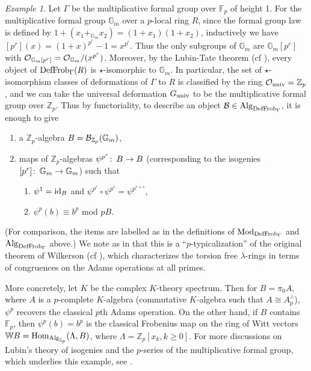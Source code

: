 \documentclass{gtpart}
\theoremstyle{definition}
\theoremstyle{remark}
\newtheorem{exam}[thm]{Example}
\def\co{\colon\thinspace}
\newcommand{\mb}[1]{\mathbb{#1}}
\newcommand{\Hom}{\ensuremath{{\rm Hom}}}
\newcommand{\Mod}{{\rm Mod}}
\newcommand{\Alg}{{\rm Alg}}
\newcommand{\CO}{{\cal O}}
\newcommand{\DF}{{{\rm DefFrob}_\Gamma}}
\newcommand{\Gm}{{{\mb G}_m}}
\begin{document}
\begin{exam}
\label{ex:K}
Let $\Gamma$ be the multiplicative formal group over ${\mb F}_p$ 
of height 1.  For the multiplicative formal group $\Gm$ over a 
$p$-local ring $R$, since the formal group law is defined by 
$1 + (x_1 +_\Gm x_2) = (1 + x_1)(1 + x_2)$, inductively we have 
$[p^r](x) = (1 + x)^{p^r} - 1 = x^{p^r}$.  Thus the only subgroups 
of $\Gm$ are $\Gm [p^r]$ with $\CO_{\Gm [p^r]} = \CO_\Gm / (x^{p^r})$.  
Moreover, by the Lubin-Tate theorem (cf \cite{lubintate}), every object of $\DF(R)$ is 
$\star$-isomorphic to $\Gm$.  In particular, the set of 
$\star$-isomorphism classes of deformations of $\Gamma$ to $R$ 
is classified by the ring $\CO_{\rm univ} = {\mb Z}_p$, and we 
can take the universal deformation $G_{\rm univ}$ to be the 
multiplicative formal group over ${\mb Z}_p$.  Thus by functoriality, 
to describe an object ${\cal B} \in \Alg_\DF$, it is enough to give
\begin{enumerate}
\item a ${\mb Z}_p$-algebra $B = {\cal B}_{{\mb Z}_p}(\Gm)$, 
\item maps of ${\mb Z}_p$-algebras $\psi^{p^r}\co B \to B$ 
(corresponding to the isogenies $[p^r]\co \Gm \to \Gm$) such that 
\begin{enumerate}
 \item $\psi^1 = {\rm id}_B$ and $\psi^{p^r} \circ \psi^{p^s} = 
\psi^{p^{r+s}}$,
 \item $\psi^p(b) \equiv b^p$ mod $pB$.
\end{enumerate}
\end{enumerate}
(For comparison, the items are labelled as in the definitions of $\Mod_\DF$ and 
$\Alg_\DF$ above.)  We note as in \cite{cong} that this is a 
``$p$-typicalization'' of the original theorem of Wilkerson 
(cf \cite{wilkerson}), which characterizes the torsion free $\lambda$-rings 
in terms of congruences on the Adams operations at all primes.

More concretely, let $K$ be the complex $K$-theory spectrum.  Then 
for $B = \pi_0 A$, where $A$ is a $p$-complete $K$-algebra 
(commutative $K$-algebra such that $A \cong A_p^\wedge$), $\psi^p$ 
recovers the classical $p$th Adams operation.  On the other hand, 
if $B$ contains ${\mb F}_p$, then $\psi^p(b) = b^p$ is the 
classical Frobenius map on the ring of Witt vectors 
${\mb W} B = \Hom_{\Alg_{{\mb Z}_p}} (\Lambda,B)$, where 
$\Lambda = {\mb Z}_p [x_k, k \geq 0]$.  For more discussions on 
Lubin's theory of isogenies and the $p$-series of the multiplicative 
formal group, which underlies this example, see \cite[example 2.7]{Andu}.
\end{exam}
\end{document}

